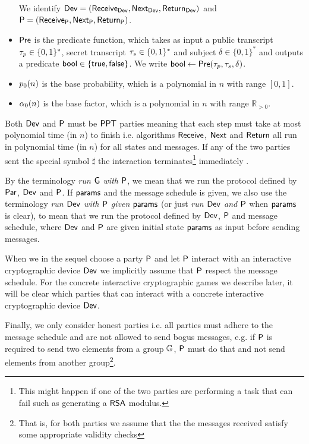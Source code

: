 \begin{defn}
\begin{itemize}
		We identify $\operatorname{\mathsf{Dev}} = (\operatorname{\mathsf{Receive}}_{\operatorname{\mathsf{Dev}}},\operatorname{\mathsf{Next}}_{\operatorname{\mathsf{Dev}}},\operatorname{\mathsf{Return}}_{\operatorname{\mathsf{Dev}}})$ and $\mathsf{P} = (\operatorname{\mathsf{Receive}}_{\mathsf{P}},\operatorname{\mathsf{Next}}_{\mathsf{P}},\operatorname{\mathsf{Return}}_{\mathsf{P}})$.
		\item $\operatorname{\mathsf{Pre}}$ is the predicate function, which takes as input a public transcript $\tau_p\in\{0,1\}^*$, secret transcript $\tau_s\in\{0,1\}^*$ and subject $\delta\in\{0,1\}^*$ and outputs a predicate $\mathsf{bool}\in\{\mathsf{true},\mathsf{false}\}$. We write $\mathsf{bool}\leftarrow \operatorname{\mathsf{Pre}}(\tau_p,\tau_s,\delta)$.
		\item $p_{0}(n)$ is the base probability, which is a polynomial in $n$ with range $[0,1]$.
		\item $\alpha_{0}(n)$ is the base factor, which is a polynomial in $n$ with range $\mathbb{R}_{>0}$. 
	\end{itemize}  
Both $\operatorname{\mathsf{Dev}}$ and $\mathsf{P}$ must be $\mathsf{PPT}$ parties meaning that each step must take at most polynomial time (in $n$) to finish i.e. algorithms $\operatorname{\mathsf{Receive}}$, $\operatorname{\mathsf{Next}}$ and $\operatorname{\mathsf{Return}}$ all run in polynomial time (in $n$) for all states and messages. If any of the two parties sent the special symbol $\sharp$ the interaction terminates\footnote{This might happen if one of the two parties are performing a task that can fail such as generating a $\mathsf{RSA}$ modulus.} immediately . 

By the terminology \emph{run $\operatorname{\mathsf{G}}$ with $\mathsf{P}$}, we mean that we run the protocol defined by $\operatorname{\mathsf{Par}}$, $\operatorname{\mathsf{Dev}}$ and $\mathsf{P}$. If $\mathsf{params}$ and the message schedule is given, we also use the terminology \emph{run $\operatorname{\mathsf{Dev}}$ with $\mathsf{P}$ given $\mathsf{params}$} (or just \emph{run $\operatorname{\mathsf{Dev}}$ and $\mathsf{P}$} when $\mathsf{params}$ is clear), to mean that we run the protocol defined by $\operatorname{\mathsf{Dev}}$, $\mathsf{P}$ and message schedule, where $\operatorname{\mathsf{Dev}}$ and $\mathsf{P}$ are given initial state $\mathsf{params}$ as input before sending messages. 

When we in the sequel choose a party $\mathsf{P}$ and let $\mathsf{P}$ interact with an interactive cryptographic device $\operatorname{\mathsf{Dev}}$ we implicitly assume that $\mathsf{P}$ respect the message schedule. For the concrete interactive cryptographic games we describe later, it will be clear which parties that can interact with a concrete interactive cryptographic device $\operatorname{\mathsf{Dev}}$.

Finally, we only consider honest parties i.e. all parties must adhere to the message schedule and are not allowed to send bogus messages, e.g. if $\mathsf{P}$ is required to send two elements from a group $\mathbb{G}$, $\mathsf{P}$ must do that and not send elements from another group\footnote{That is, for both parties we assume that the the messages received satisfy some appropriate validity checks}. 
\end{defn}


